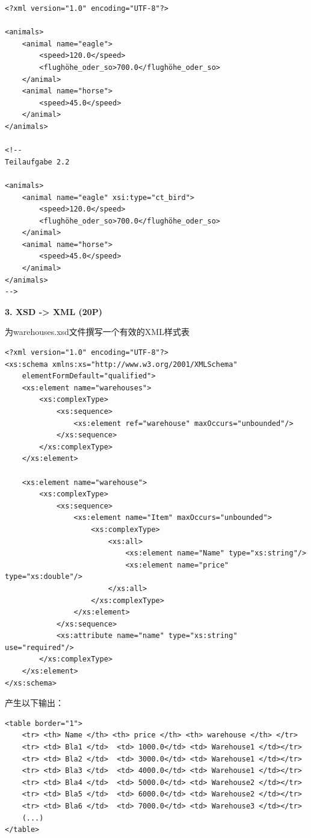 \documentclass[fontset=windows]{article}
\begin{document}
\begin{verbatim}
<?xml version="1.0" encoding="UTF-8"?>

<animals>
  	<animal name="eagle">
    	<speed>120.0</speed>
    	<flughöhe_oder_so>700.0</flughöhe_oder_so>
  	</animal>
  	<animal name="horse">
    	<speed>45.0</speed>
  	</animal>
</animals>

<!--
Teilaufgabe 2.2

<animals>
  	<animal name="eagle" xsi:type="ct_bird">
    	<speed>120.0</speed>
    	<flughöhe_oder_so>700.0</flughöhe_oder_so>
  	</animal>
  	<animal name="horse">
    	<speed>45.0</speed>
  	</animal>
</animals>
-->
\end{verbatim}

\noindent\textbf{3. XSD -> XML (20P)}

为warehouses.xsd文件撰写一个有效的XML样式表

\begin{verbatim}
<?xml version="1.0" encoding="UTF-8"?>
<xs:schema xmlns:xs="http://www.w3.org/2001/XMLSchema" 
	elementFormDefault="qualified">
  	<xs:element name="warehouses">
    	<xs:complexType>
      		<xs:sequence>
        		<xs:element ref="warehouse" maxOccurs="unbounded"/>
      		</xs:sequence>
    	</xs:complexType>
  	</xs:element>
  
  	<xs:element name="warehouse">
    	<xs:complexType>
      		<xs:sequence>
       	 		<xs:element name="Item" maxOccurs="unbounded">
          			<xs:complexType>
            			<xs:all>
              				<xs:element name="Name" type="xs:string"/>
              				<xs:element name="price" type="xs:double"/>
            			</xs:all>
          			</xs:complexType>
        		</xs:element>
      		</xs:sequence>
      		<xs:attribute name="name" type="xs:string" use="required"/>
    	</xs:complexType>
  	</xs:element>
</xs:schema>
\end{verbatim}

产生以下输出：

\begin{verbatim}
<table border="1">
	<tr> <th> Name </th> <th> price </th> <th> warehouse </th> </tr>
	<tr> <td> Bla1 </td>  <td> 1000.0</td> <td> Warehouse1 </td></tr>
	<tr> <td> Bla2 </td>  <td> 3000.0</td> <td> Warehouse1 </td></tr>
	<tr> <td> Bla3 </td>  <td> 4000.0</td> <td> Warehouse1 </td></tr>
	<tr> <td> Bla4 </td>  <td> 5000.0</td> <td> Warehouse2 </td></tr>
	<tr> <td> Bla5 </td>  <td> 6000.0</td> <td> Warehouse2 </td></tr>
	<tr> <td> Bla6 </td>  <td> 7000.0</td> <td> Warehouse3 </td></tr>
	(...)
</table>
\end{verbatim}
\end{document}
